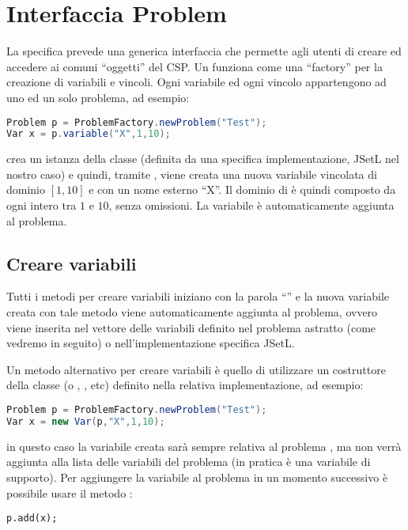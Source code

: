 \section{Interfaccia Problem}\label{intProblem}
La specifica prevede una generica interfaccia  che permette
agli utenti di creare ed accedere ai comuni ``oggetti'' del CSP. Un 
 funziona come una ``factory'' per la creazione di variabili e
vincoli. Ogni variabile ed ogni vincolo appartengono ad uno ed un solo problema,
ad esempio:
\begin{lstlisting}[language = Java]
Problem p = ProblemFactory.newProblem("Test");
Var x = p.variable("X",1,10);
\end{lstlisting}
crea un istanza  della classe  (definita da una
specifica implementazione, JSetL nel nostro caso) e quindi, tramite ,
viene creata una nuova variabile vincolata  di dominio $[1,10]$ e 
con un nome esterno ``X''. Il dominio di  è quindi composto da ogni
intero tra $1$ e $10$, senza omissioni. La variabile è automaticamente aggiunta
al problema.

\subsection{Creare variabili}
Tutti i metodi per creare variabili iniziano con la parola ``''
e la nuova variabile creata con tale metodo viene automaticamente aggiunta 
al problema, ovvero viene inserita nel vettore delle variabili definito
nel problema astratto (come vedremo in seguito) o nell'implementazione
specifica JSetL.

Un metodo alternativo per creare variabili è quello di utilizzare un costruttore
della classe  (o , , etc) definito
nella relativa implementazione, ad esempio:
\begin{lstlisting}[language = Java]
Problem p = ProblemFactory.newProblem("Test");
Var x = new Var(p,"X",1,10);
\end{lstlisting}
in questo caso la variabile creata sarà sempre relativa al problema ,
ma non verrà aggiunta alla lista delle variabili del problema (in pratica è
una variabile di supporto). Per aggiungere la variabile al problema in un 
momento successivo è possibile usare il metodo :
\begin{center}
\lstinline$p.add(x);$
\end{center}

